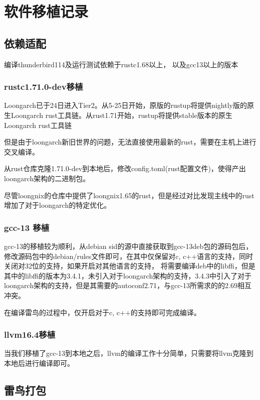 \documentclass[lang=cn,a4paper,newtx]{elegantpaper}
\begin{document}
\section{软件移植记录}
\subsection{依赖适配}

编译thunderbird114及运行测试依赖于rustc1.68以上， 以及gcc13以上的版本

\subsubsection{rustc1.71.0-dev移植}
Loongarch已于24日进入Tier2。从5-25日开始，原版的rustup将提供nightly版的原生Loongarch rust工具链。从rust1.71开始，rustup将提供stable版本的原生Loongarch rust工具链

但是由于loongarch新旧世界的问题，无法直接使用最新的rust，需要在主机上进行交叉编译。

从rust仓库克隆1.71.0-dev到本地后，修改config.toml(rust配置文件)，使得产出loongarch架构的二进制包。

尽管loongnix的仓库中提供了loongnix1.65的rust，但是经过对比发现主线中的rust增加了对于loongarch的特定优化。

\subsubsection{gcc-13 移植}

gcc-13的移植较为顺利，从debian sid的源中直接获取到gcc-13deb包的源码包后，修改源码包中的debian/rules文件即可，在其中仅保留对c, c++语言的支持，同时关闭对32位的支持，如果开启对其他语言的支持，
将需要编译deb中的libffi，但是其中的libffi的版本为3.4.1，未引入对于loongarch架构的支持，3.4.3中引入了对于loongarch架构的支持，但是其需要的autoconf2.71，与gcc-13所需求的的2.69相互冲突。

在编译雷鸟的过程中，仅开启对于c, c++的支持即可完成编译。

\subsubsection{llvm16.4移植}

当我们移植了gcc-13到本地之后，llvm的编译工作十分简单，只需要将llvm克隆到本地后进行编译即可。

\subsection{雷鸟打包}
\end{document}
